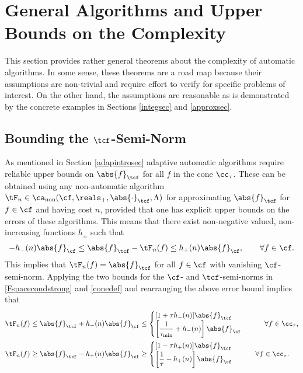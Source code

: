 \documentclass[]{elsarticle}
\DeclareMathOperator{\fix}{non}
\theoremstyle{definition}
\theoremstyle{remark}
\newcommand{\Fnorm}[1]{\abs{#1}_{\cf}}
\newcommand{\Ftnorm}[1]{\abs{#1}_{\tcf}}
\begin{document}
\section{General Algorithms and Upper Bounds on the Complexity} \label{genthmsec}

This section provides rather general theorems about the complexity of automatic algorithms.  In some sense, these theorems are a road map because their assumptions are non-trivial and require effort to verify for specific problems of interest.  On the other hand, the assumptions are reasonable as is demonstrated by the concrete examples in Sections \ref{integsec} and \ref{approxsec}.  

\subsection{Bounding the $\tcf$-Semi-Norm} \label{Galgosec}

As mentioned in Section \ref{adapintrosec} adaptive automatic algorithms require reliable upper bounds on $\Ftnorm{f}$ for all $f$ in the cone $\cc_{\tau}$. These can be obtained using any non-automatic algorithm $\tF_n \in \ca_{\fix}(\cf,\reals_+,\Ftnorm{\cdot},\Lambda)$ for approximating $\Ftnorm{f}$ for $f \in \cf$ and having cost $n$, provided that one has explicit upper bounds on the errors of these algorithms.  This means that there exist non-negative valued, non-increasing functions $h_{\pm}$ such that
\begin{equation} \label{Gerrbds}
-h_{-}(n)\Fnorm{f} \le \Ftnorm{f}- \tF_n(f) \le h_{+}(n) \Fnorm{f}, \qquad \forall f \in \cf.
\end{equation}
This implies that $\tF_n(f)=\Ftnorm{f}$ for all $f \in \cf$ with vanishing $\cf$-semi-norm.  Applying the two bounds for the $\cf$- and $\tcf$-semi-norms in \eqref{Fspacecondstrong} and \eqref{conedef} and rearranging the above error bound implies that 
\begin{align*} 
\tF_n(f) &\le \Ftnorm{f} + h_{-}(n)\Fnorm{f} \le \begin{cases} [1+ \tau h_{-}(n)]\Ftnorm{f} \\
\displaystyle \left [\frac{1}{\tau_{\min}}+h_{-}(n) \right]\Fnorm{f} 
\end{cases} \qquad \forall f \in \cc_{\tau},\\
\tF_n(f) &\ge \Ftnorm{f} - h_{+}(n)\Fnorm{f} \ge \begin{cases} [1 - \tau h_{+}(n)]\Ftnorm{f} \\
\displaystyle \left [\frac{1}{\tau}-h_{+}(n) \right]\Fnorm{f} 
\end{cases} \qquad \forall f \in \cc_{\tau}.
\end{align*}
\end{document}
